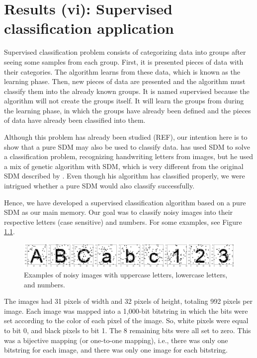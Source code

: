 
\chapter{Results (vi): Supervised classification application}

Supervised classification problem consists of categorizing data into groups after seeing some samples from each group. First, it is presented pieces of data with their categories. The algorithm learns from these data, which is known as the learning phase. Then, new pieces of data are presented and the algorithm must classify them into the already known groups. It is named supervised because  the algorithm will not create the groups itself. It will learn the groups from during the learning phase, in which the groups have already been defined and the pieces of data have already been classified into them.

Although this problem has already been studied (REF), our intention here is to show that a pure SDM may also be used to classify data. \citet{fan1997genetic} has used SDM to solve a classification problem, recognizing handwriting letters from images, but he used a mix of genetic algorithm with SDM, which is very different from the original SDM described by \cite{Kanerva1988}. Even though his algorithm has classified properly, we were intrigued whether a pure SDM would also classify successfully.

Hence, we have developed a supervised classification algorithm based on a pure SDM as our main memory. Our goal was to classify noisy images into their respective letters (case sensitive) and numbers. For some examples, see Figure \ref{fig-classification-examples}.

\begin{figure}[!htb]
\centering\includegraphics[width=\textwidth]{./images02/classification/example.png}
\caption{Examples of noisy images with uppercase letters, lowercase letters, and numbers.
\label{fig-classification-examples}}
\end{figure}

The images had 31 pixels of width and 32 pixels of height, totaling 992 pixels per image. Each image was mapped into a 1,000-bit bitstring in which the bits were set according to the color of each pixel of the image. So, white pixels were equal to bit 0, and black pixels to bit 1. The 8 remaining bits were all set to zero. This was a bijective mapping (or one-to-one mapping), i.e., there was only one bitstring for each image, and there was only one image for each bitstring.

